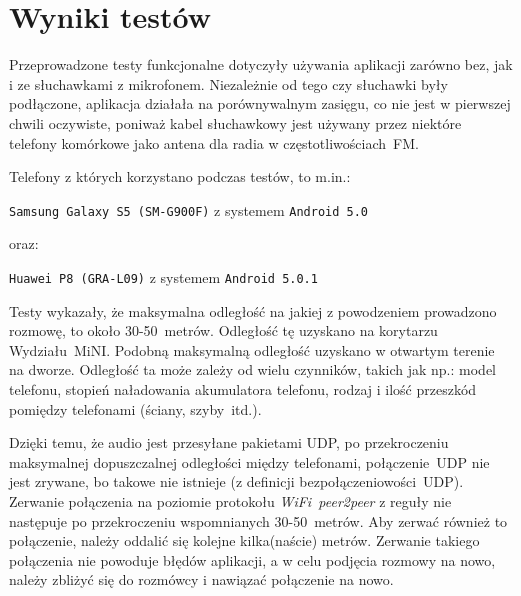 \documentclass[a4paper,titlepage]{article}
\theoremstyle{break}
\begin{document}

\section{Wyniki testów}

Przeprowadzone testy funkcjonalne dotyczyły używania aplikacji zarówno bez, jak i ze słuchawkami z mikrofonem. Niezależnie od tego czy słuchawki były podłączone, aplikacja działała na porównywalnym zasięgu, co nie jest w pierwszej chwili oczywiste, poniważ kabel słuchawkowy jest używany przez niektóre telefony komórkowe jako antena dla radia w częstotliwościach~FM.

Telefony z których korzystano podczas testów, to m.in.:
\begin{center}
	\texttt{Samsung~Galaxy~S5~(SM-G900F)} z systemem \texttt{Android~5.0}
\end{center}
oraz:
\begin{center}
	\texttt{Huawei~P8~(GRA-L09)} z systemem \texttt{Android~5.0.1}
\end{center}
Testy wykazały, że maksymalna odległość na jakiej z powodzeniem prowadzono rozmowę, to około 30-50~metrów. Odległość tę uzyskano na korytarzu Wydziału~MiNI. Podobną maksymalną odległość uzyskano w otwartym terenie na dworze. Odległość ta może zależy od wielu czynników, takich jak np.: model telefonu, stopień naładowania akumulatora telefonu, rodzaj i ilość przeszkód pomiędzy telefonami (ściany, szyby~itd.).

Dzięki temu, że audio jest przesyłane pakietami UDP, po przekroczeniu maksymalnej dopuszczalnej odległości między telefonami, połączenie~UDP nie jest zrywane, bo takowe nie istnieje (z definicji bezpołączeniowości~UDP). Zerwanie połączenia na poziomie protokołu \emph{WiFi~peer2peer} z reguły nie następuje po przekroczeniu wspomnianych 30-50~metrów. Aby zerwać również to połączenie, należy oddalić się kolejne kilka(naście) metrów. Zerwanie takiego połączenia nie powoduje błędów aplikacji, a w celu podjęcia rozmowy na nowo, należy zbliżyć się do rozmówcy i nawiązać połączenie na nowo.


\newpage
\end{document}

